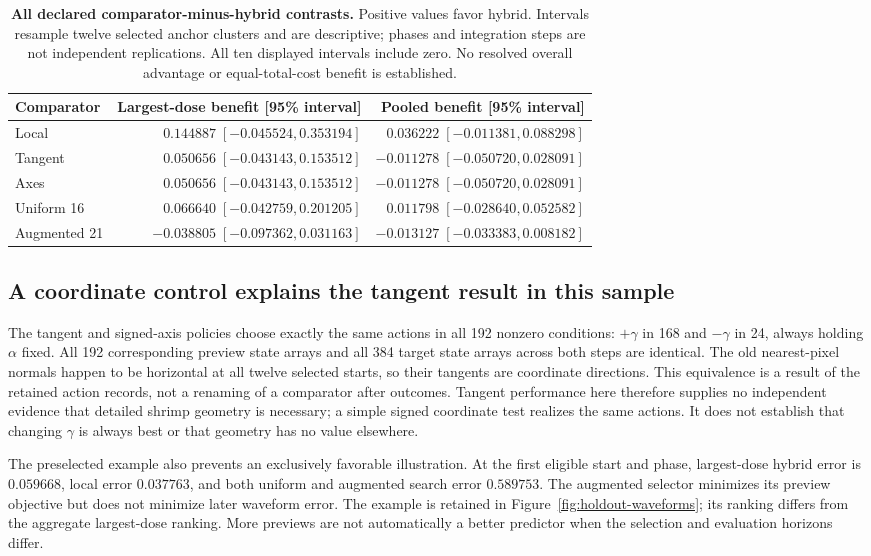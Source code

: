 \begin{table}[H]
\centering\small
\setlength{\tabcolsep}{4pt}
\begin{tabular}{lrr}
\toprule
Comparator & Largest-dose benefit [95\% interval] & Pooled benefit [95\% interval]\\
\midrule
Local & $0.144887\;[-0.045524,0.353194]$ & $0.036222\;[-0.011381,0.088298]$\\
Tangent & $0.050656\;[-0.043143,0.153512]$ & $-0.011278\;[-0.050720,0.028091]$\\
Axes & $0.050656\;[-0.043143,0.153512]$ & $-0.011278\;[-0.050720,0.028091]$\\
Uniform 16 & $0.066640\;[-0.042759,0.201205]$ & $0.011798\;[-0.028640,0.052582]$\\
Augmented 21 & $-0.038805\;[-0.097362,0.031163]$ & $-0.013127\;[-0.033383,0.008182]$\\
\bottomrule
\end{tabular}
\caption{\textbf{All declared comparator-minus-hybrid contrasts.} Positive values favor hybrid. Intervals resample twelve selected anchor clusters and are descriptive; phases and integration steps are not independent replications. All ten displayed intervals include zero. No resolved overall advantage or equal-total-cost benefit is established.}
\label{tab:holdout-contrasts}
\end{table}

\subsection{A coordinate control explains the tangent result in this sample}
The tangent and signed-axis policies choose exactly the same actions in all 192 nonzero conditions: $+\gamma$ in 168 and $-\gamma$ in 24, always holding $\alpha$ fixed. All 192 corresponding preview state arrays and all 384 target state arrays across both steps are identical. The old nearest-pixel normals happen to be horizontal at all twelve selected starts, so their tangents are coordinate directions. This equivalence is a result of the retained action records, not a renaming of a comparator after outcomes. Tangent performance here therefore supplies no independent evidence that detailed shrimp geometry is necessary; a simple signed coordinate test realizes the same actions. It does not establish that changing $\gamma$ is always best or that geometry has no value elsewhere.

The preselected example also prevents an exclusively favorable illustration. At the first eligible start and phase, largest-dose hybrid error is $0.059668$, local error $0.037763$, and both uniform and augmented search error $0.589753$. The augmented selector minimizes its preview objective but does not minimize later waveform error. The example is retained in Figure~\ref{fig:holdout-waveforms}; its ranking differs from the aggregate largest-dose ranking. More previews are not automatically a better predictor when the selection and evaluation horizons differ.

